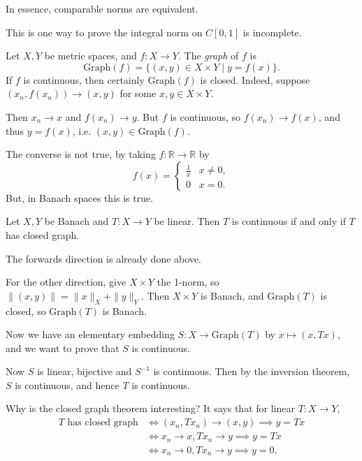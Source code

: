 \documentclass[12pt]{article}
\begin{document}
In essence, comparable norms are equivalent.

\begin{remark}
	This is one way to prove the integral norm on $C[0,1]$ is incomplete.
\end{remark}


Let $X, Y$ be metric spaces, and $f : X \to Y$. The \emph{graph} of $f$ is
\[
	\mathrm{Graph}(f) = \{(x, y) \in X \times Y \mid y = f(x)\}.
\]
If $f$ is continuous, then certainly $\mathrm{Graph}(f)$ is closed. Indeed, suppose $(x_n, f(x_n)) \to (x, y)$ for some $x, y \in X \times Y$.

Then $x_n \to x$ and $f(x_n) \to y$. But $f$ is continuous, so $f(x_n) \to f(x)$, and thus $y = f(x)$, i.e. $(x, y) \in \mathrm{Graph}(f)$.

The converse is not true, by taking $f : \mathbb{R} \to \mathbb{R}$ by
\[
f(x) =
\begin{cases}
	\frac{1}{x} & x \neq 0,\\
	0 & x = 0.
\end{cases}
\]
But, in Banach spaces this is true.

\begin{theorem}
	Let $X, Y$ be Banach and $T : X \to Y$ be linear. Then $T$ is continuous if and only if $T$ has closed graph.
\end{theorem}

\begin{proofbox}
	The forwards direction is already done above.

	For the other direction, give $X \times Y$ the 1-norm, so $\|(x, y)\| = \|x\|_X + \|y\|_Y$. Then $X \times Y$ is Banach, and $\mathrm{Graph}(T)$ is closed, so $\mathrm{Graph}(T)$ is Banach.

	Now we have an elementary embedding $S : X \to \mathrm{Graph}(T)$ by $x \mapsto (x, Tx)$, and we want to prove that $S$ is continuous.

	Now $S$ is linear, bijective and $S^{-1}$ is continuous. Then by the inversion theorem, $S$ is continuous, and hence $T$ is continuous.
\end{proofbox}

Why is the closed graph theorem interesting? It says that for linear $T : X \to Y$,
\begin{align*}
	T \text{ has closed graph} &\iff (x_n, T x_n) \to (x, y) \implies y = Tx \\
				   &\iff x_n \to x, Tx_n \to y \implies y = Tx \\
				   &\iff x_n \to 0, Tx_n \to y \implies y = 0.
\end{align*}
\end{document}
